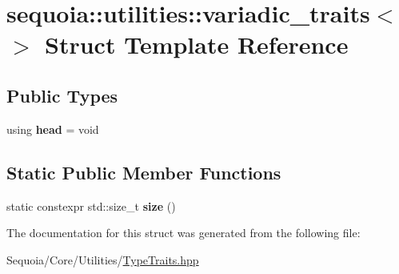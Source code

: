 \hypertarget{structsequoia_1_1utilities_1_1variadic__traits_3_4}{}\section{sequoia\+::utilities\+::variadic\+\_\+traits$<$$>$ Struct Template Reference}
\label{structsequoia_1_1utilities_1_1variadic__traits_3_4}
\subsection*{Public Types}
\begin{DoxyCompactItemize}
\item 
\mbox{\label{structsequoia_1_1utilities_1_1variadic__traits_3_4_abd22f15849dc6efd52486fdb37940b40}} 
using {\bfseries head} = void
\end{DoxyCompactItemize}
\subsection*{Static Public Member Functions}
\begin{DoxyCompactItemize}
\item 
\mbox{\label{structsequoia_1_1utilities_1_1variadic__traits_3_4_ae3eeef4804c96dfbc526ec0c915f810b}} 
static constexpr std\+::size\+\_\+t {\bfseries size} ()
\end{DoxyCompactItemize}


The documentation for this struct was generated from the following file\+:\begin{DoxyCompactItemize}
\item 
Sequoia/\+Core/\+Utilities/\mbox{\hyperlink{_type_traits_8hpp}{Type\+Traits.\+hpp}}\end{DoxyCompactItemize}
